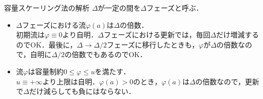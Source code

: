\documentclass[14pt,aspectratio=169,xcolor=dvipsnames,table,onlytextwidth,dvipdfmx]{beamer}
\begin{document}
\begin{frame}{容量スケーリング法の解析}
    $\Delta$が一定の間を\alert{$\Delta$フェーズ}と呼ぶ．

    \bigskip
    \begin{itemize}
        \setlength{\itemsep}{1em}

        \item $\Delta$フェーズにおける流$\varphi(a)$は$\Delta$の倍数． \\
        {\footnotesize {} 初期流は$\varphi \equiv 0$より自明．$\Delta$フェーズにおける更新では，毎回$\Delta$だけ増減するのでOK．最後に，$\Delta \rightarrow \Delta/2$フェーズに移行したときも，$\varphi$が$\Delta$の倍数なので，自明に$\Delta/2$の倍数でもあるのでOK．}

        \item 流$\varphi$は容量制約$0 \leq \varphi \leq u$を満たす． \\
        {\footnotesize {} $u \equiv +\infty$より上限は自明．$\varphi(a) > 0$のとき，$\varphi(a)$は$\Delta$の倍数なので，更新で$\Delta$だけ減らしても負にはならない．}
    \end{itemize}
\end{frame}
\end{document}
